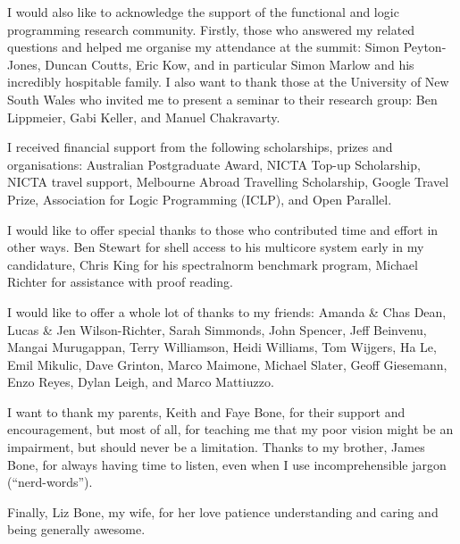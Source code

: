\documentclass[a4paper,twoside,openright]{report}
\begin{document}
I would also like to acknowledge the support of the functional and logic
programming research community.
Firstly, those who answered my \tscope related questions and helped me
organise my attendance at the \tscope summit:
Simon Peyton-Jones,
Duncan Coutts,
Eric Kow,
and in particular Simon Marlow and his incredibly hospitable family.
I also want to thank those at the University of New South Wales who invited
me to present a seminar to their research group:
Ben Lippmeier,
Gabi Keller,
and Manuel Chakravarty.

I received financial support from the following scholarships, prizes and
organisations:
Australian Postgraduate Award,
NICTA Top-up Scholarship,
NICTA travel support,
Melbourne Abroad Travelling Scholarship,
Google Travel Prize,
Association for Logic Programming (ICLP),
and
Open Parallel.

I would like to offer special thanks to those who contributed time and
effort in other ways.
Ben Stewart for shell access to his multicore system early in my candidature,
Chris King for his spectralnorm benchmark program,
Michael Richter for assistance with proof reading.

I would like to offer a whole lot of thanks to my friends:
Amanda \& Chas Dean,
Lucas \& Jen Wilson-Richter,
Sarah Simmonds, John Spencer,
Jeff Beinvenu, Mangai Murugappan,
Terry Williamson, Heidi Williams,
Tom Wijgers,
Ha Le,
Emil Mikulic,
Dave Grinton,
Marco Maimone,
Michael Slater,
Geoff Giesemann,
Enzo Reyes,
Dylan Leigh,
and Marco Mattiuzzo.

I want to thank my parents, Keith and Faye Bone, for their support and
encouragement,
but most of all,
for teaching me that my poor vision might be an impairment, but should never
be a limitation.
Thanks to my brother, James Bone, for always having time to listen,
even when I use incomprehensible jargon (``nerd-words'').

Finally, Liz Bone, my wife,
for her love patience understanding and caring
and being generally awesome.


\tableofcontents

\listoffigures

\listoftables

\listofalgorithms











\end{document}
